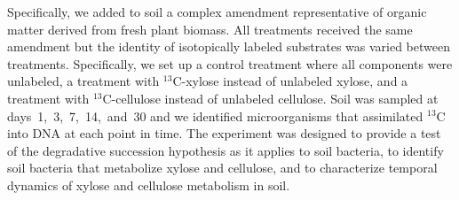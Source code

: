 Specifically, we added to soil a complex amendment representative of organic
matter derived from fresh plant biomass. All treatments received the same
amendment but the identity of isotopically labeled substrates was varied
between treatments. Specifically, we set up a control treatment where all
components were unlabeled, a treatment with $^{13}$C-xylose instead of
unlabeled xylose, and a treatment with $^{13}$C-cellulose instead of unlabeled
cellulose. Soil was sampled at days~1,~3,~7,~14,~and~30 and we identified
microorganisms that assimilated $^{13}$C into DNA at each point in time. The
experiment was designed to provide a test of the degradative succession
hypothesis as it applies to soil bacteria, to identify soil bacteria that
metabolize xylose and cellulose, and to characterize temporal dynamics of
xylose and cellulose metabolism in soil. 
